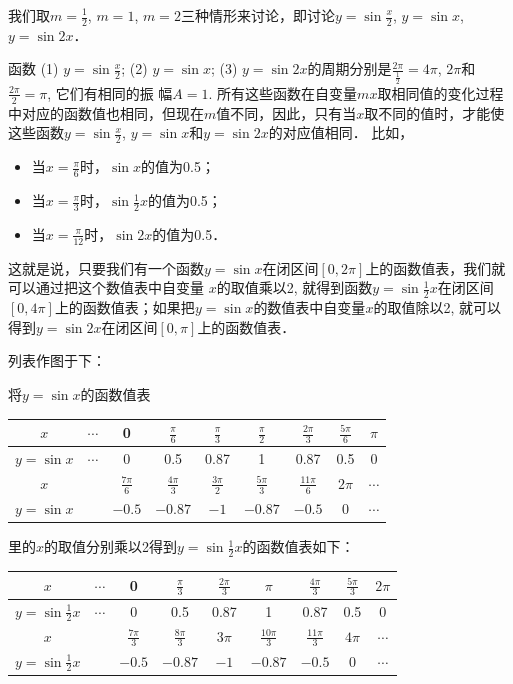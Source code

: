 我们取$m=\frac{1}{2}$, $m=1$, $m=2$三种情形来讨论，即讨论$y=\sin\frac{x}{2}$, $y=\sin x$, $y=\sin2x$．

函数 (1) $y=\sin\frac{x}{2}$; (2) $y=\sin x$; (3) $y=\sin 2x$的周期分别是$\frac{2\pi}{\frac{1}{2}}=4\pi$, $2\pi$和$\frac{2\pi}{2}=\pi$, 它们有相同的振
幅$A=1$. 所有这些函数在自变量$mx$取相同值的变化过程中对应的函数值也相同，但现在$m$值不同，因此，只有当$x$取不同的值时，才能使这些函数$y=\sin\frac{x}{2}$, $y=\sin x$和$y=\sin 2x$的对应值相同．
比如，
\begin{itemize}
    \item 当$x=\frac{\pi}{6}$时，$\sin x$的值为0.5；
    \item 当$x=\frac{\pi}{3}$时，$\sin \frac{1}{2}x$的值为0.5；
    \item 当$x=\frac{\pi}{12}$时，$\sin 2x$的值为0.5．
\end{itemize}

这就是说，只要我们有一个函数$y=\sin x$在闭区间$[0,2\pi]$上的函数值表，我们就可以通过把这个数值表中自变量
$x$的取值乘以2, 就得到函数$y=\sin\frac{1}{2}x$在闭区间$[0,4\pi]$上的函数值表；如果把$y=\sin x$的数值表中自变量$x$的取值除以2, 就可以得到$y=\sin 2x$在闭区间$[0,\pi]$上的函数值表．

列表作图于下：

将$y=\sin x$的函数值表
\begin{center}
\begin{tabular}{c|cccccccc}
\hline
$x$ &  $\cdots$   &  0    &  $\frac{\pi}{6}$     &   $\frac{\pi}{3}$     &   $\frac{\pi}{2}$      &  $\frac{2\pi}{3}$         &  $\frac{5\pi}{6}$ &  $\pi$  \\
\hline
$y=\sin x$ &  $\cdots$   &    0  & 0.5      &  0.87     &  1      &   0.87       &  0.5   & 0\\
\hline
$x$ &     & $\frac{7\pi}{6}$      &   $\frac{4\pi}{3}$     &  $\frac{3\pi}{2}$      &  $\frac{5\pi}{3}$       &    $\frac{11\pi}{6}$       &  $2\pi$ & $\cdots$   \\
\hline
$y=\sin x$ &      &  $-0.5$   &  $-0.87$    &   $-1$    & $-0.87$      &   $-0.5$     &   0      & $\cdots$\\
\hline
\end{tabular}
\end{center}
里的$x$的取值分别乘以2得到$y=\sin\frac{1}{2}x$的函数值表如下：
\begin{center}
\begin{tabular}{c|cccccccc}
\hline
$x$ &  $\cdots$   &  0    &  $\frac{\pi}{3}$     &   $\frac{2\pi}{3}$     &   $\pi$      &  $\frac{4\pi}{3}$         &  $\frac{5\pi}{3}$ &  $2\pi$  \\
\hline
$y=\sin\frac{1}{2}x$ &  $\cdots$   &    0  & 0.5      &  0.87     &  1      &   0.87       &  0.5   & 0\\
\hline
$x$ &     & $\frac{7\pi}{3}$      &   $\frac{8\pi}{3}$     &  $3\pi$      &  $\frac{10\pi}{3}$       &    $\frac{11\pi}{3}$       &  $4\pi$ & $\cdots$   \\
\hline
$y=\sin\frac{1}{2}x$ &      &  $-0.5$   &  $-0.87$    &   $-1$    & $-0.87$      &   $-0.5$     &   0      & $\cdots$\\
\hline
\end{tabular}
\end{center}


